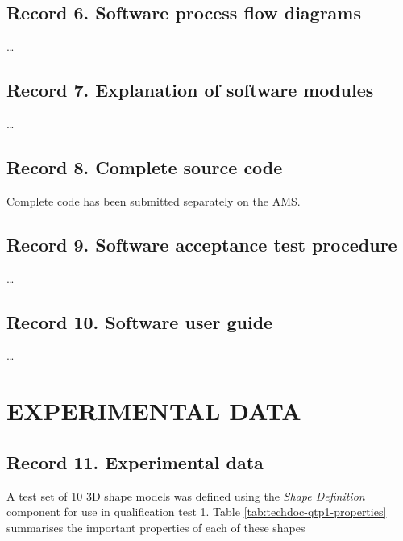 \subsection{Record 6. Software process flow diagrams}

\ldots

\newpage

\subsection{Record 7. Explanation of software modules}

\ldots

\newpage

\subsection{Record 8. Complete source code}
Complete code has been submitted separately on the AMS.

\newpage

\subsection{Record 9. Software acceptance test procedure}

\ldots

\newpage

\subsection{Record 10. Software user guide}

\ldots

\newpage


\section{EXPERIMENTAL DATA}

\subsection{Record 11. Experimental data}


A test set of 10 3D shape models was defined using the \textit{Shape Definition} component for use in qualification test 1. Table \ref{tab:techdoc-qtp1-properties} summarises the important properties of each of these shapes

